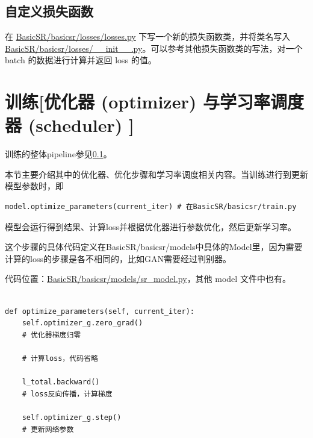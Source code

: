 \documentclass[../main.tex]{subfiles}
\begin{document}
\subsection{自定义损失函数}

在 \href{https://github.com/XPixelGroup/BasicSR/blob/master/basicsr/losses/losses.py}{BasicSR/basicsr/losses/losses.py} 下写一个新的损失函数类，并将类名写入\href{https://github.com/XPixelGroup/BasicSR/blob/master/basicsr/losses/__init__.py}{BasicSR/basicsr/losses/\_\_init\_\_.py}。可以参考其他损失函数类的写法，对一个 batch 的数据进行计算并返回 loss 的值。



\section{训练[优化器 (optimizer) 与学习率调度器 (scheduler) ]}\label{code_structure:training}

\begin{note} %
    训练的整体pipeline参见\ref{}。
\end{note}

本节主要介绍其中的优化器、优化步骤和学习率调度相关内容。当训练进行到更新模型参数时，即
\begin{verbatim}
model.optimize_parameters(current_iter) # 在BasicSR/basicsr/train.py
\end{verbatim}

模型会运行得到结果、计算loss并根据优化器进行参数优化，然后更新学习率。

这个步骤的具体代码定义在BasicSR/basicsr/models中具体的Model里，因为需要计算的loss的步骤是各不相同的，比如GAN需要经过判别器。

代码位置：\href{https://github.com/XPixelGroup/BasicSR/blob/master/basicsr/models/sr_model.py}{BasicSR/basicsr/models/sr\_model.py}，其他 model 文件中也有。

\begin{verbatim}

def optimize_parameters(self, current_iter):
    self.optimizer_g.zero_grad()
    # 优化器梯度归零

    # 计算loss，代码省略

    l_total.backward()
    # loss反向传播，计算梯度

    self.optimizer_g.step()
    # 更新网络参数
\end{verbatim}
\end{document}
